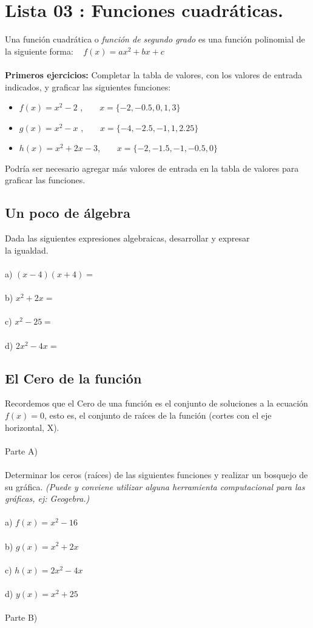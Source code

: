 \documentclass[11pt, a4paper]{article}
\begin{document}
\section{ Lista 03 : Funciones cuadr\'aticas. }
Una funci\'on cuadr\'atica o \textit{ funci\'on de segundo grado } es una funci\'on polinomial de la siguiente forma: ~ $ f(x) = ax^2 + bx + c $ \\ \\
\textbf{ Primeros ejercicios: } Completar la tabla de valores, con los valores de entrada indicados,  y graficar las siguientes funciones: 
\begin{itemize}
    \item $ f(x) = x^2 - 2 $ , ~ ~ $x = \{ -2, -0.5, 0, 1, 3 \} $ 
    \item $ g(x) = x^2 - x $ , ~ ~ $x = \{ -4, -2.5, -1, 1, 2.25 \} $
    \item $ h(x) = x^2 + 2x - 3 $, ~ ~ $x = \{ -2, -1.5, -1, -0.5, 0 \} $ \\
\end{itemize} 
Podr\'ia ser necesario agregar m\'as valores de entrada en la tabla de valores para graficar las funciones.  

\subsection*{Un poco de \'algebra }
Dada las siguientes expresiones algebraicas, desarrollar y expresar \\la igualdad. \\ \\
a) $ (x-4)(x+4) = $ \\ \\ 
b) $ x^2 + 2x =  $ \\ \\ 
c) $ x^2 - 25 = $ \\ \\ 
d) $ 2x^2 - 4x = $

\newpage

\subsection{El Cero de la funci\'on }
Recordemos que el Cero de una funci\'on es el conjunto de soluciones a la ecuaci\'on $ f(x) = 0 $, esto es, el conjunto de ra\'ices de la funci\'on (cortes con el eje horizontal, X). \\ \\
Parte A) \\ \\ 
Determinar los ceros (ra\'ices) de las siguientes funciones y realizar un bosquejo de su gr\'afica. \textit{(Puede y conviene utilizar alguna herramienta computacional para las gr\'aficas, ej: Geogebra.)} \\ \\
a) $ f(x) = x^2 - 16 $ \\ \\
b) $ g(x) = x^2 + 2x $ \\ \\
c) $ h(x) = 2x^2 - 4x $ \\ \\
d) $ y(x) = x^2 + 25 $ \\ \\ 
Parte B) 
\end{document}
